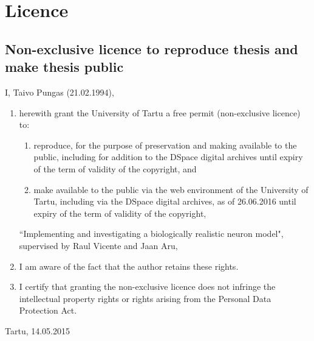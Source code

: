 \documentclass[a4paper,12pt]{report}
\theoremstyle{definition}
\newcommand{\thesistitle}{Implementing and investigating a biologically realistic neuron model} %
\begin{document}

\chapter*{Licence}


%
%
\section*{Non-exclusive licence to reproduce thesis and make thesis public}
I, Taivo Pungas (21.02.1994), 
\begin{enumerate}
	\item herewith grant the University of Tartu a free permit (non-exclusive licence) to:
	\begin{enumerate}[label*=\arabic*.]
		\renewcommand{\theenumi}{\arabic{enumi}}
		\item reproduce, for the purpose of preservation and making available to the public, including for addition to the DSpace digital archives until expiry of the term of validity of the copyright, and
		\item make available to the public via the web environment of the University of Tartu, including via the DSpace digital archives, as of 26.06.2016 until expiry of the term of validity of the copyright,
	\end{enumerate}
	``\thesistitle", supervised by Raul Vicente and Jaan Aru,
	
	\item I am aware of the fact that the author retains these rights.

	\item I certify that granting the non-exclusive licence does not infringe the intellectual property rights or rights arising from the Personal Data Protection Act. 
\end{enumerate}

Tartu, 14.05.2015

\thispagestyle{empty}
\newpage
\end{document}
